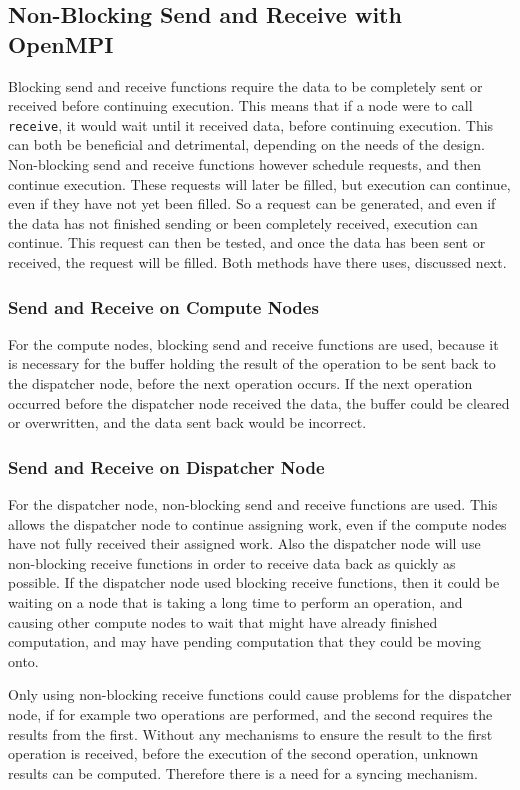 \subsection{Non-Blocking Send and Receive with OpenMPI}
Blocking send and receive functions require the data to be completely sent or received before continuing execution. This means that if a node were to call \verb|receive|, it would wait until it received data, before continuing execution. This can both be beneficial and detrimental, depending on the needs of the design. Non-blocking send and receive functions however schedule requests, and then continue execution. These requests will later be filled, but execution can continue, even if they have not yet been filled. So a request can be generated, and even if the data has not finished sending or been completely received, execution can continue. This request can then be tested, and once the data has been sent or received, the request will be filled. Both methods have there uses, discussed next.

\subsubsection{Send and Receive on Compute Nodes}
For the compute nodes, blocking send and receive functions are used, because it is necessary for the buffer holding the result of the operation to be sent back to the dispatcher node, before the next operation occurs. If the next operation occurred before the dispatcher node received the data, the buffer could be cleared or overwritten, and the data sent back would be incorrect.

\subsubsection{Send and Receive on Dispatcher Node}
For the dispatcher node, non-blocking send and receive functions are used. This allows the dispatcher node to continue assigning work, even if the compute nodes have not fully received their assigned work. Also the dispatcher node will use non-blocking receive functions in order to receive data back as quickly as possible. If the dispatcher node used blocking receive functions, then it could be waiting on a node that is taking a long time to perform an operation, and causing other compute nodes to wait that might have already finished computation, and may have pending computation that they could be moving onto. 

Only using non-blocking receive functions could cause problems for the dispatcher node, if for example two operations are performed, and the second requires the results from the first. Without any mechanisms to ensure the result to the first operation is received, before the execution of the second operation, unknown results can be computed. Therefore there is a need for a syncing mechanism.

